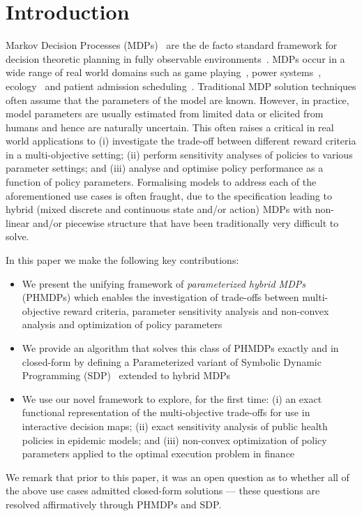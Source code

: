 \section{Introduction}
\label{sec:introduction}

Markov Decision Processes (MDPs)~\parencite{Howard_MIT_1960} are the de facto standard framework for decision theoretic planning in fully
observable environments~\parencite{Boutilier_JAIR_1999}. MDPs occur in a wide range of real world domains such as game playing~\parencite{Szita_RL_2012}, power systems~\parencite{Reddy_IJCAI_2011}, ecology~\parencite{Williams_EM_2009} and patient admission
scheduling~\parencite{Zhu_AIM_2014}. Traditional MDP solution techniques often assume that the parameters of the model are
known. However, in practice, model parameters are usually estimated from limited data or elicited from humans and hence are naturally uncertain.  This often raises a critical in real world applications to (i) investigate the trade-off between different reward criteria in a multi-objective setting; (ii) perform sensitivity analyses of policies to various parameter settings; and (iii) analyse and optimise policy performance as a function of policy parameters.  Formalising models to address each of the aforementioned use cases is often fraught, due to the
specification leading to hybrid (mixed discrete and continuous state and/or action) MDPs with non-linear and/or piecewise structure that have been traditionally very difficult to solve.

In this paper we make the following key contributions:
\begin{itemize}
\item We present the unifying framework of {\it parameterized hybrid MDPs} (PHMDPs) which enables the investigation of trade-offs between
  multi-objective reward criteria, parameter sensitivity analysis and non-convex analysis and optimization of policy parameters
\item We provide an algorithm that solves this class of PHMDPs exactly and in closed-form by defining a Parameterized variant of Symbolic Dynamic Programming (SDP)~\parencite{Boutilier_IJCAI_2001} extended to hybrid MDPs~\parencite{Sanner_UAI_2011}
\item We use our novel framework to explore, for the first time: (i) an exact functional representation of the multi-objective
  trade-offs for use in interactive decision maps; (ii) exact sensitivity analysis of public health policies in epidemic models; and (iii) non-convex optimization of policy parameters applied to the optimal execution problem in finance
\end{itemize}
We remark that prior to this paper, it was an open question as to whether all of the above use cases admitted closed-form solutions --- these questions are resolved affirmatively through PHMDPs and SDP.

